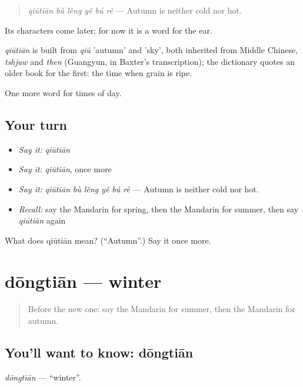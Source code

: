 \begin{quote}
\emph{qiūtiān bù lěng yě bú rè} — Autumn is neither cold nor hot.
\end{quote}

Its characters come later; for now it is a word for the ear.

\begin{cousinweb}
\emph{qiūtiān} is built from \emph{qiū} 'autumn' and  'sky', both inherited from Middle Chinese, \emph{tshjuw} and \emph{then} (Guangyun, in Baxter's transcription); the dictionary quotes an older book for the first: the time when grain is ripe.
\end{cousinweb}

\begin{grammarlens}[title={What you've built}]
One more word for times of day.
\end{grammarlens}

\subsection*{Your turn}
\begin{itemize}
\raggedright
  \item \emph{Say it:} \emph{qiūtiān}
  \item \emph{Say it:} \emph{qiūtiān}, once more
  \item \emph{Say it:} \emph{qiūtiān bù lěng yě bú rè} — Autumn is neither cold nor hot.
  \item \emph{Recall:} say the Mandarin for spring, then the Mandarin for summer, then say \emph{qiūtiān} again
\end{itemize}

\begin{tcolorbox}[breakable,colback=teal!4,colframe=teal!35!black,title={Before you move on}]
What does qiūtiān mean? (\textquotedblleft{}Autumn\textquotedblright{}.) Say it once more.
\end{tcolorbox}
\section[dōngtiān]{dōngtiān — winter}

\label{lesson:ZH-C131-dongtian}



\begin{quote}
Before the new one: say the Mandarin for summer, then the Mandarin for autumn.
\end{quote}

\subsection*{You'll want to know: dōngtiān}
\emph{dōngtiān} — \textquotedblleft{}winter\textquotedblright{}.

